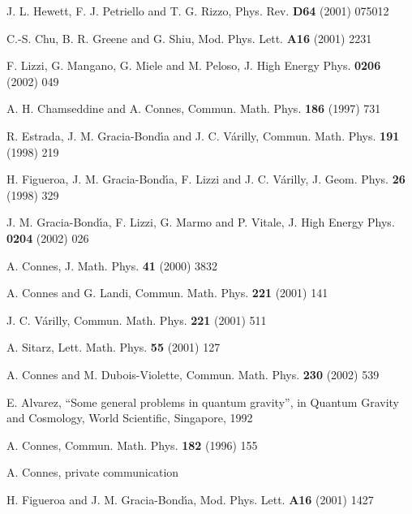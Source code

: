 \documentclass[a4paper,12pt]{article}
\providecommand{\1}{\mathbf{1}}         %
\providecommand{\7}{\dagger}            %
\providecommand{\8}{\bullet}            %
\renewcommand{\.}{\cdot}            %
\renewcommand{\:}{\colon}           %
\begin{document}
\begin{thebibliography}{92}
J. L. Hewett, F. J. Petriello and T. G. Rizzo,
Phys. Rev. {\bf D64} (2001) 075012

C.-S. Chu, B. R. Greene and G. Shiu,
Mod. Phys. Lett. {\bf A16} (2001) 2231

F. Lizzi, G. Mangano, G. Miele and M. Peloso,
J. High Energy Phys. {\bf 0206} (2002) 049

A. H. Chamseddine and A. Connes,
Commun. Math. Phys. {\bf 186} (1997) 731

R. Estrada, J. M. Gracia-Bond\'{\i}a and J. C. V\'arilly,
Commun. Math. Phys. {\bf 191} (1998) 219

H. Figueroa, J. M. Gracia-Bond\'{\i}a, F. Lizzi and J. C. V\'arilly,
J. Geom. Phys. {\bf 26} (1998) 329

J. M. Gracia-Bond\'{\i}a, F. Lizzi, G. Marmo and P. Vitale,
J. High Energy Phys. {\bf 0204} (2002) 026

A. Connes,
J. Math. Phys. {\bf 41} (2000) 3832

A. Connes and G. Landi,
Commun. Math. Phys. {\bf 221} (2001) 141

J. C. V\'arilly,
Commun. Math. Phys. {\bf 221} (2001) 511

A. Sitarz,
Lett. Math. Phys. {\bf 55} (2001) 127

A. Connes and M. Dubois-Violette,
Commun. Math. Phys. {\bf 230} (2002) 539

E. Alvarez,
``Some general problems in quantum gravity'',
in Quantum Gravity and Cosmology,
World Scientific, Singapore, 1992

A. Connes,
Commun. Math. Phys. {\bf 182} (1996) 155

A. Connes, private communication

H. Figueroa and J. M. Gracia-Bond\'{\i}a,
Mod. Phys. Lett. {\bf A16} (2001) 1427


\end{thebibliography}
\end{document}
